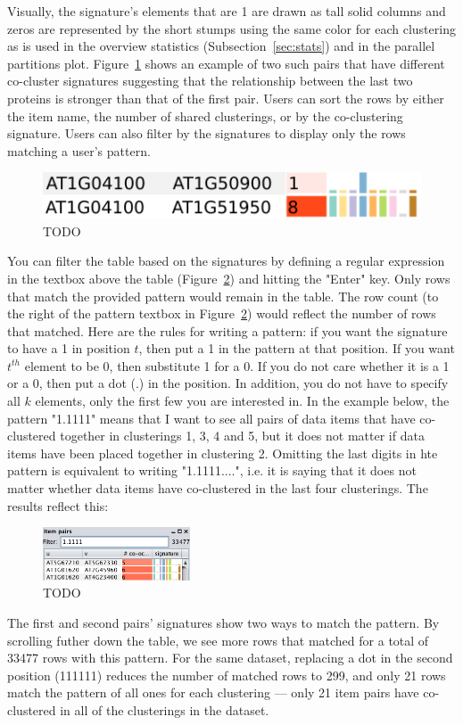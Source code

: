 Visually, the signature's elements that are 1 are drawn as tall
solid columns and zeros are represented by the short stumps using the same color
for each clustering as is used in the overview statistics 
(Subsection~\ref{sec:stats}) and in the parallel partitions plot. 
Figure~\ref{fig:signature} shows an example of two such pairs that have 
different co-cluster signatures suggesting that the relationship between the 
last two \Athal proteins is stronger than that of the first pair. Users can sort
the rows by either the item name, the number of shared clusterings, or by the 
co-clustering signature. Users can also filter by the signatures to display only
the rows matching a user's pattern.

\begin{figure}[ht]
	\centering
    \includegraphics[width=0.3\linewidth]{item-pair-crisp.pdf}
	\caption{TODO}
	\label{fig:signature}
\end{figure}

You can filter the table based on the signatures by defining a regular 
expression in the textbox above the table (Figure~\ref{fig:filter-pairs}) and 
hitting the "Enter" key. Only rows that match the provided pattern would remain 
in the table. The row count (to the right of the pattern textbox in 
Figure~\ref{fig:filter-pairs}) would reflect the number of rows that matched.
Here are the rules for writing a pattern: if you want the signature to have a 1 
in position $t$, then put a 1 in the pattern at that position. If you want 
$t^{th}$ element to be 0, then substitute 1 for a 0. If you do not care whether 
it is a 1 or a 0, then put a dot (.) in the position. In addition, you do not 
have to specify all $k$ elements, only the first few you are interested in. In 
the example below, the pattern "1.1111" means that I want to see all pairs of 
data items that have co-clustered together in clusterings 1, 3, 4 and 5, but it 
does not matter if data items have been placed together in clustering 2. 
Omitting the last digits in hte pattern is equivalent to writing "1.1111....", 
i.e. it is saying that it does not matter whether data items have co-clustered 
in the last four clusterings. The results reflect this:
%
\begin{figure}[ht]
  \centering
  \includegraphics[width=0.39\textwidth]{filter-pairs}
  \caption{TODO}
  \label{fig:filter-pairs}
\end{figure}
%
The first and second pairs' signatures show two ways to match the pattern. 
By scrolling futher down the table, we see more rows that matched for a total of
33477 rows with this pattern. For the same dataset, replacing a dot in the 
second position (111111) reduces the number of matched rows to 299, and only 21
rows match the pattern of all ones for each clustering --- only 21 item pairs
have co-clustered in all of the clusterings in the dataset.


